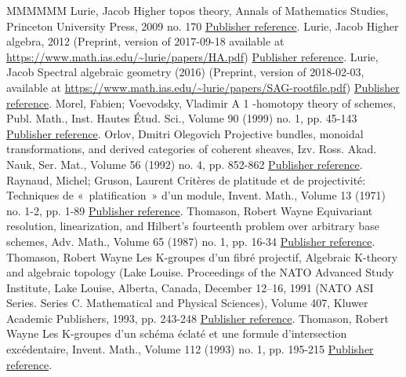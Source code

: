\begin{thebibliography}{MMMMMM}
 Lurie, Jacob Higher topos theory, Annals of Mathematics Studies, Princeton University Press, 2009 no. 170 \href{https://ahl.centre-mersenne.org/item/AHL_2020__3__1091_0/#HTT}{Publisher reference}.
 Lurie, Jacob Higher algebra, 2012 (Preprint, version of 2017-09-18 available at \url{https://www.math.ias.edu/~lurie/papers/HA.pdf}) \href{https://ahl.centre-mersenne.org/item/AHL_2020__3__1091_0/#HA-20170918}{Publisher reference}.
 Lurie, Jacob Spectral algebraic geometry (2016) (Preprint, version of 2018-02-03, available at \url{https://www.math.ias.edu/~lurie/papers/SAG-rootfile.pdf}) \href{https://ahl.centre-mersenne.org/item/AHL_2020__3__1091_0/#SAG-20180204}{Publisher reference}.
 Morel, Fabien; Voevodsky, Vladimir A 1 -homotopy theory of schemes, Publ. Math., Inst. Hautes Étud. Sci., Volume 90 (1999) no. 1, pp. 45-143 \href{https://ahl.centre-mersenne.org/item/AHL_2020__3__1091_0/#MorelVoevodsky}{Publisher reference}.
 Orlov, Dmitri Olegovich Projective bundles, monoidal transformations, and derived categories of coherent sheaves, Izv. Ross. Akad. Nauk, Ser. Mat., Volume 56 (1992) no. 4, pp. 852-862 \href{https://ahl.centre-mersenne.org/item/AHL_2020__3__1091_0/#OrlovSOD}{Publisher reference}.
 Raynaud, Michel; Gruson, Laurent Critères de platitude et de projectivité: Techniques de « platification »  d’un module, Invent. Math., Volume 13 (1971) no. 1-2, pp. 1-89 \href{https://ahl.centre-mersenne.org/item/AHL_2020__3__1091_0/#RaynaudGruson}{Publisher reference}.
 Thomason, Robert Wayne Equivariant resolution, linearization, and Hilbert’s fourteenth problem over arbitrary base schemes, Adv. Math., Volume 65 (1987) no. 1, pp. 16-34 \href{https://ahl.centre-mersenne.org/item/AHL_2020__3__1091_0/#ThomasonEquivariant}{Publisher reference}.
 Thomason, Robert Wayne Les K-groupes d’un fibré projectif, Algebraic K-theory and algebraic topology (Lake Louise. Proceedings of the NATO Advanced Study Institute, Lake Louise, Alberta, Canada, December 12–16, 1991 (NATO ASI Series. Series C. Mathematical and Physical Sciences), Volume 407, Kluwer Academic Publishers, 1993, pp. 243-248 \href{https://ahl.centre-mersenne.org/item/AHL_2020__3__1091_0/#ThomasonProjectiveBundle}{Publisher reference}.
 Thomason, Robert Wayne Les K-groupes d’un schéma éclaté et une formule d’intersection excédentaire, Invent. Math., Volume 112 (1993) no. 1, pp. 195-215 \href{https://ahl.centre-mersenne.org/item/AHL_2020__3__1091_0/#ThomasonBlowup}{Publisher reference}.

\end{thebibliography}
